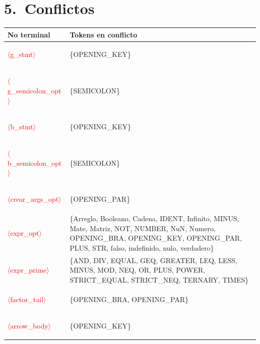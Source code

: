 \documentclass[10pt]{article}
\begin{document}
\section*{5.\ Conflictos}

{\footnotesize
\begin{longtable}{@{} p{3.5cm} p{13cm} @{}}
  \toprule
  \textbf{No terminal} & \textbf{Tokens en conflicto} \\
  \midrule \endhead
  \textcolor{red}{\raggedright$\langle$g\_stmt$\rangle$} & \{OPENING\_KEY\} \\
  \textcolor{red}{\raggedright$\langle$g\_semicolon\_opt$\rangle$} & \{SEMICOLON\} \\
  \textcolor{red}{\raggedright$\langle$b\_stmt$\rangle$} & \{OPENING\_KEY\} \\
  \textcolor{red}{\raggedright$\langle$b\_semicolon\_opt$\rangle$} & \{SEMICOLON\} \\
  \textcolor{red}{\raggedright$\langle$crear\_args\_opt$\rangle$} & \{OPENING\_PAR\} \\
  \textcolor{red}{\raggedright$\langle$expr\_opt$\rangle$} & \{Arreglo, Booleano, Cadena, IDENT, Infinito, MINUS, Mate, Matriz, NOT, NUMBER, NuN, Numero, OPENING\_BRA, OPENING\_KEY, OPENING\_PAR, PLUS, STR, falso, indefinido, nulo, verdadero\} \\
  \textcolor{red}{\raggedright$\langle$expr\_prime$\rangle$} & \{AND, DIV, EQUAL, GEQ, GREATER, LEQ, LESS, MINUS, MOD, NEQ, OR, PLUS, POWER, STRICT\_EQUAL, STRICT\_NEQ, TERNARY, TIMES\} \\
  \textcolor{red}{\raggedright$\langle$factor\_tail$\rangle$} & \{OPENING\_BRA, OPENING\_PAR\} \\
  \textcolor{red}{\raggedright$\langle$arrow\_body$\rangle$} & \{OPENING\_KEY\} \\
  \bottomrule
\end{longtable}
}
\end{document}
